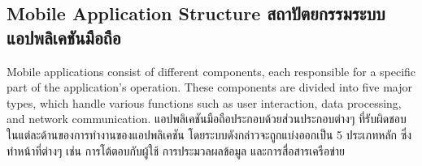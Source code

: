 \subsection{\ifenglish Mobile Application Structure \else สถาปัตยกรรมระบบแอปพลิเคชันมือถือ \fi}

\ifenglish
Mobile applications consist of different components, each responsible for a specific part of the application’s operation. These components are divided into five major types, which handle various functions such as user interaction, data processing, and network communication.
\else
แอปพลิเคชันมือถือประกอบด้วยส่วนประกอบต่างๆ ที่รับผิดชอบในแต่ละด้านของการทำงานของแอปพลิเคชัน โดยระบบดังกล่าวจะถูกแบ่งออกเป็น 5 ประเภทหลัก ซึ่งทำหน้าที่ต่างๆ เช่น การโต้ตอบกับผู้ใช้ การประมวลผลข้อมูล และการสื่อสารเครือข่าย
\fi

\ifenglish
